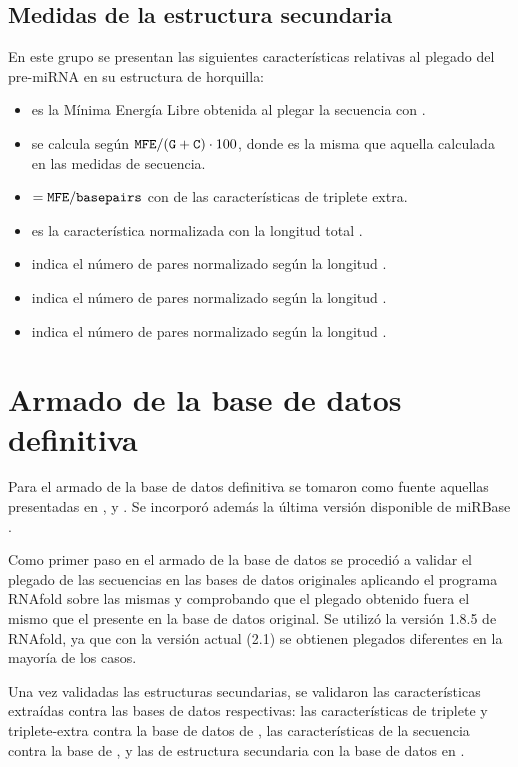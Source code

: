 \documentclass[12pt,bibliography=oldstyle,DIV=12,parskip=half-]{scrartcl}
\begin{document}
\subsection{Medidas de la estructura secundaria}
En este grupo se presentan las siguientes características relativas al
plegado del pre-miRNA en su estructura de horquilla:
\begin{itemize}
\item{} es la Mínima Energía Libre obtenida al plegar la
  secuencia con .
\item{} se calcula según ${{\tt MFE}}/{({\tt G+C})\cdot
  100}$, donde  es la misma que aquella calculada en las
  medidas de secuencia.
\item{}$={\tt MFE}/{\tt basepairs}$ con 
  de las características de triplete extra.
\item{} es la característica  normalizada con
  la longitud total .
\item{} indica el número de pares 
  normalizado según la longitud .
\item{} indica el número de pares 
  normalizado según la longitud .
\item{} indica el número de pares 
  normalizado según la longitud .
\end{itemize}
%
%
%
%
\section{Armado de la base de datos definitiva}
Para el armado de la base de datos definitiva se tomaron como fuente
aquellas presentadas en \cite{xue}, \cite{ng} y \cite{batuwita}.
Se incorporó además la última versión disponible de miRBase \cite{mirbase}.

Como primer paso en el armado de la base de datos se
procedió a validar el plegado de las secuencias en las bases de datos
originales aplicando el programa RNAfold sobre las mismas y
comprobando que el plegado obtenido fuera el mismo que el presente en
la base de datos original. Se utilizó la versión 1.8.5 de RNAfold, ya
que con la versión actual (2.1) se obtienen plegados diferentes en la
mayoría de los casos.

Una vez validadas las estructuras secundarias, se validaron las
características extraídas contra las bases de datos respectivas: las
características de triplete y triplete-extra contra la base de datos
de \cite{xue}, las características de la secuencia contra la base de
\cite{ng}, y las de estructura secundaria con la base de datos en
\cite{batuwita}.
\end{document}
